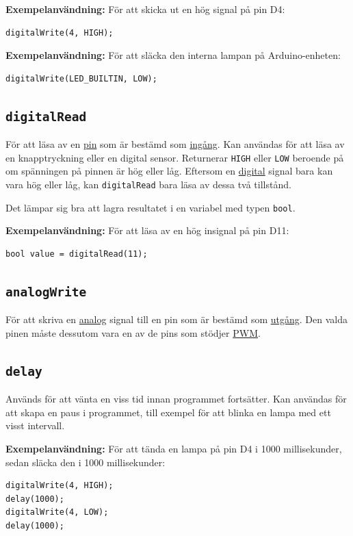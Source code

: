 \documentclass[11pt]{article}
\begin{document}
\textbf{Exempelanvändning:}
För att skicka ut en hög signal på pin D4:
\begin{lstlisting}
digitalWrite(4, HIGH);
\end{lstlisting}

\textbf{Exempelanvändning:}
För att släcka den interna lampan på Arduino-enheten:
\begin{lstlisting}
digitalWrite(LED_BUILTIN, LOW);
\end{lstlisting}

\subsection{\texttt{digitalRead}}
För att läsa av en \hyperref[sec:pin]{pin} som är bestämd som
\hyperref[sec:io]{ingång}. Kan användas för att läsa av en knapptryckning eller
en digital sensor. Returnerar \texttt{HIGH} eller \texttt{LOW} beroende på om
spänningen på pinnen är hög eller låg. Eftersom en
\hyperref[sec:analog-digital]{digital} signal bara kan vara hög eller låg, kan
\texttt{digitalRead} bara läsa av dessa två tillstånd.

Det lämpar sig bra att lagra resultatet i en variabel med typen \texttt{bool}.

\textbf{Exempelanvändning:}
För att läsa av en hög insignal på pin D11:
\begin{lstlisting}
bool value = digitalRead(11);
\end{lstlisting}

\subsection{\texttt{analogWrite}}
För att skriva en \hyperref[sec:analog-digital]{analog} signal till en pin som
är bestämd som \hyperref[sec:io]{utgång}. Den valda pinen måste dessutom vara en
av de pins som stödjer \hyperref[sec:pwm]{PWM}.

\subsection{\texttt{delay}}
Används för att vänta en viss tid innan programmet fortsätter. Kan användas för
att skapa en paus i programmet, till exempel för att blinka en lampa med ett
visst intervall.

\textbf{Exempelanvändning:}
För att tända en lampa på pin D4 i 1000 millisekunder, sedan släcka den i 1000
millisekunder:

\begin{lstlisting}
digitalWrite(4, HIGH);
delay(1000);
digitalWrite(4, LOW);
delay(1000);
\end{lstlisting}
\end{document}
